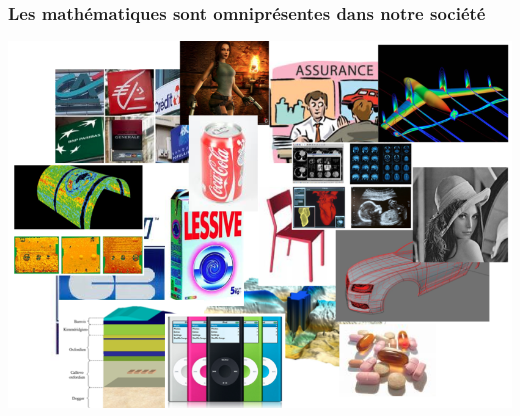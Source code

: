 \documentclass[slideopt,A4]{beamer}
\begin{document}
\begin{frame}
\frametitle{Les mathématiques sont omniprésentes dans notre société}
%
\begin{center}
\includegraphics[width=0.90\linewidth]{mix.png}
\end{center}

\end{frame}
%
%
\end{document}
